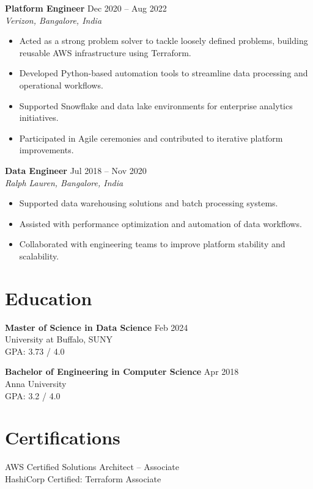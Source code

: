 \documentclass[10pt]{article} %
\begin{document}
\textbf{Platform Engineer} \hfill Dec 2020 -- Aug 2022 \\
\textit{Verizon, Bangalore, India}
\begin{itemize}[leftmargin=*, itemsep=3pt]
    \item Acted as a strong problem solver to tackle loosely defined problems, building reusable AWS infrastructure using Terraform. %
    \item Developed Python-based automation tools to streamline data processing and operational workflows. %
    \item Supported Snowflake and data lake environments for enterprise analytics initiatives. %
    \item Participated in Agile ceremonies and contributed to iterative platform improvements. %
\end{itemize}

\textbf{Data Engineer} \hfill Jul 2018 -- Nov 2020 \\
\textit{Ralph Lauren, Bangalore, India}
\begin{itemize}[leftmargin=*, itemsep=3pt]
    \item Supported data warehousing solutions and batch processing systems. %
    \item Assisted with performance optimization and automation of data workflows. %
    \item Collaborated with engineering teams to improve platform stability and scalability. %
\end{itemize}

\section*{Education}

\textbf{Master of Science in Data Science} \hfill Feb 2024 \\
University at Buffalo, SUNY \\
GPA: 3.73 / 4.0

\textbf{Bachelor of Engineering in Computer Science} \hfill Apr 2018 \\
Anna University \\
GPA: 3.2 / 4.0

\section*{Certifications}
AWS Certified Solutions Architect – Associate \\
HashiCorp Certified: Terraform Associate
\end{document}
